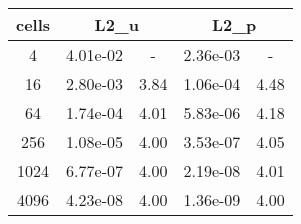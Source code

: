 \documentclass[10pt]{report}
\begin{document}
\begin{table}[H]
\begin{center}
\begin{tabular}{|c|c|c|c|c|} \hline
cells & 
\multicolumn{2}{|c|}{L2_u} & 
\multicolumn{2}{|c|}{L2_p}\\ \hline
4 & 4.01e-02 & - & 2.36e-03 & -\\ \hline
16 & 2.80e-03 & 3.84 & 1.06e-04 & 4.48\\ \hline
64 & 1.74e-04 & 4.01 & 5.83e-06 & 4.18\\ \hline
256 & 1.08e-05 & 4.00 & 3.53e-07 & 4.05\\ \hline
1024 & 6.77e-07 & 4.00 & 2.19e-08 & 4.01\\ \hline
4096 & 4.23e-08 & 4.00 & 1.36e-09 & 4.00\\ \hline
\end{tabular}
\end{center}
\end{table}
\end{document}
